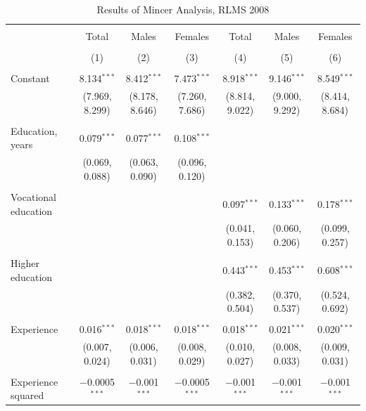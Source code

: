 \documentclass[alpha-refs]{wiley-article-01g}
\begin{document}
\begin{landscape}
	
	\fontsize{9}{11}
	\selectfont
	
	\begin{table}[!htbp] \centering 
\renewcommand{\arraystretch}{1.0}
		\caption{Results of Mincer Analysis, RLMS 2008} 
		\label{} 
		\begin{tabular}{@{\extracolsep{5pt}}lcccccc} 
			\\[-.8ex]\hline 
			\hline \\[-.8ex] 
			& Total & Males & Females & Total & Males & Females \\ 
			\\[-.8ex] & (1) & (2) & (3) & (4) & (5) & (6)\\ 
			\hline \\[-.8ex] 
			Constant & 8.134$^{***}$ & 8.412$^{***}$ & 7.473$^{***}$ & 8.918$^{***}$ & 9.146$^{***}$ & 8.549$^{***}$ \\ 
			& (7.969, 8.299) & (8.178, 8.646) & (7.260, 7.686) & (8.814, 9.022) & (9.000, 9.292) & (8.414, 8.684) \\ 
			& & & & & & \\ 
			Education, years & 0.079$^{***}$ & 0.077$^{***}$ & 0.108$^{***}$ &  &  &  \\ 
			& (0.069, 0.088) & (0.063, 0.090) & (0.096, 0.120) &  &  &  \\ 
			& & & & & & \\ 
			Vocational education &  &  &  & 0.097$^{***}$ & 0.133$^{***}$ & 0.178$^{***}$ \\ 
			&  &  &  & (0.041, 0.153) & (0.060, 0.206) & (0.099, 0.257) \\ 
			& & & & & & \\ 
			Higher education &  &  &  & 0.443$^{***}$ & 0.453$^{***}$ & 0.608$^{***}$ \\ 
			&  &  &  & (0.382, 0.504) & (0.370, 0.537) & (0.524, 0.692) \\ 
			& & & & & & \\ 
			Experience & 0.016$^{***}$ & 0.018$^{***}$ & 0.018$^{***}$ & 0.018$^{***}$ & 0.021$^{***}$ & 0.020$^{***}$ \\ 
			& (0.007, 0.024) & (0.006, 0.031) & (0.008, 0.029) & (0.010, 0.027) & (0.008, 0.033) & (0.009, 0.031) \\ 
			& & & & & & \\ 
			Experience squared & $-$0.0005$^{***}$ & $-$0.001$^{***}$ & $-$0.0005$^{***}$ & $-$0.001$^{***}$ & $-$0.001$^{***}$ & $-$0.001$^{***}$ \\ 

\end{tabular}
\end{table}
\end{landscape}
\end{document}

